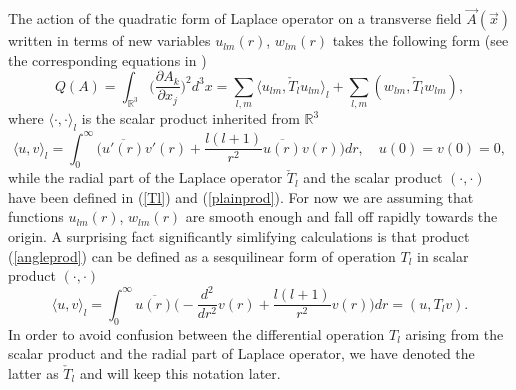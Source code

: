 \documentclass[12pt]{article}
\newcommand{\ol}{\overline}
\newcommand{\RR}{\mathbb{R}}
\begin{document}
	The action of the quadratic form of Laplace operator on a transverse field
$ \vec{A}(\vec{x}) $
	written in terms of new variables
$ u_{lm}(r) $,
$ w_{lm}(r) $
	takes the following form (see the corresponding equations in
\cite{Lapl})
\begin{equation*}
        Q(A) = \int_{\RR^{3}}
        \bigl(\frac{\partial A_{k}}{\partial x_{j}}\bigr)^{2} d^{3} x 
	= \sum_{l,m}\langle u_{lm},\check{T}_{l}u_{lm}\rangle_{l}
	    + \sum_{l,m}(w_{lm},\check{T}_{l}w_{lm}) ,
\end{equation*}
	where
$ \langle \cdot , \cdot \rangle_{l} $
	is the scalar product inherited from 
$ \RR^{3} $
\begin{equation}
\label{angleprod}
    \langle u, v\rangle_{l} = \int_{0}^{\infty} \bigl(
	\ol{u'(r)}v'(r) + \frac{l(l+1)}{r^{2}} \ol{u(r)}v(r)\bigr) dr ,
    \quad u(0) = v(0) = 0,
\end{equation}
	while the radial part of the Laplace operator
$ \check{T}_{l} $
	and the scalar product
$ (\cdot,\cdot) $
	have been defined in
(\ref{Tl}) and
(\ref{plainprod}).
	For now we are assuming that functions
$ u_{lm}(r) $,
$ w_{lm}(r) $
	are smooth enough and fall off rapidly towards the origin.
	A surprising fact significantly simlifying calculations is that
	product
(\ref{angleprod})
	can be defined as a sesquilinear form of operation
$ T_{l} $
	in scalar product
$ (\cdot,\cdot) $
\begin{equation}
\label{Tprod}
    \langle u,v\rangle_{l} = \int_{0}^{\infty} \ol{u(r)} \bigl(
	-\frac{d^{2}}{dr^{2}}v(r) + \frac{l(l+1)}{r^{2}}v(r) \bigr) dr
	= (u, T_{l}v).
\end{equation}
	In order to avoid confusion between the differential operation
$ T_{l} $
	arising from the scalar product and the radial part of Laplace operator,
	we have denoted the latter as
$ \check{T}_{l} $
	and will keep this notation later.
\end{document}
